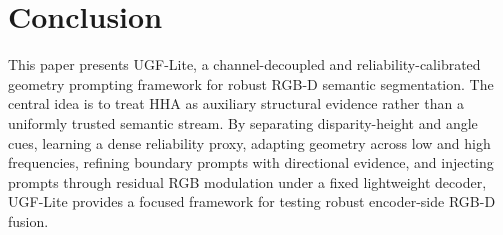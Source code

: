 \documentclass[a4paper,fleqn]{cas-dc}
\begin{document}
\section{Conclusion}\label{sec:conclusion}

This paper presents UGF-Lite, a channel-decoupled and reliability-calibrated geometry prompting framework for robust RGB-D semantic segmentation. The central idea is to treat HHA as auxiliary structural evidence rather than a uniformly trusted semantic stream. By separating disparity-height and angle cues, learning a dense reliability proxy, adapting geometry across low and high frequencies, refining boundary prompts with directional evidence, and injecting prompts through residual RGB modulation under a fixed lightweight decoder, UGF-Lite provides a focused framework for testing robust encoder-side RGB-D fusion.

\printcredits

%





\end{document}
